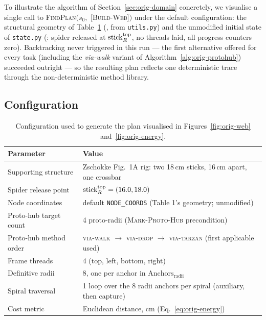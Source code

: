 To illustrate the algorithm of Section~\ref{sec:orig-domain} concretely, we visualise a single call to \textsc{FindPlan}$(s_0,$ [\textsc{Build-Web}]$)$ under the default configuration: the structural geometry of Table~\ref{tab:orig-config} (, from \texttt{utils.py}) and the unmodified initial state of \texttt{state.py} (: spider released at $\mathrm{stick}_{R}^{\mathrm{top}}$, no threads laid, all progress counters zero). Backtracking never triggered in this run --- the first alternative offered for every task (including the \textit{via-walk} variant of Algorithm~\ref{alg:orig-protohub}) succeeded outright --- so the resulting plan reflects one deterministic trace through the non-deterministic method library.

\subsection{Configuration}
\label{sec:orig-config}

\begin{table}[H]
\centering
{\small
\begin{tabular}{ll}
\toprule
\textbf{Parameter} & \textbf{Value} \\
\midrule
Supporting structure & Zschokke Fig.~1A rig: two 18\,cm sticks, 16\,cm apart, one crossbar \\
Spider release point & $\mathrm{stick}_{R}^{\mathrm{top}} = (16.0, 18.0)$ \\
Node coordinates & default \texttt{NODE\_COORDS} (Table 1's geometry; unmodified) \\
Proto-hub target count & 4 proto-radii (\textsc{Mark-Proto-Hub} precondition) \\
Proto-hub method order & \textsc{via-walk} $\to$ \textsc{via-drop} $\to$ \textsc{via-tarzan} (first applicable used) \\
Frame threads & 4 (top, left, bottom, right) \\
Definitive radii & 8, one per anchor in $\mathrm{Anchors}_{\mathrm{radii}}$ \\
Spiral traversal & 1 loop over the 8 radii anchors per spiral (auxiliary, then capture) \\
Cost metric & Euclidean distance, cm (Eq.~\ref{eq:orig-energy}) \\
\bottomrule
\end{tabular}}
\caption{Configuration used to generate the plan visualised in Figures~\ref{fig:orig-web} and~\ref{fig:orig-energy}.}
\label{tab:orig-config}
\end{table}

